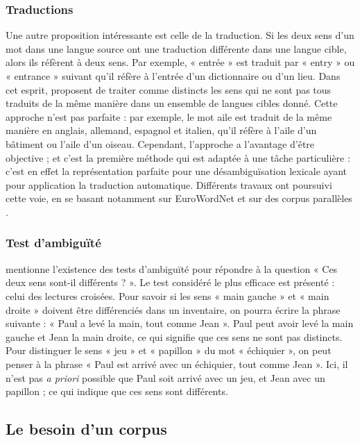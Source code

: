 \subsubsection{Traductions}

Une autre proposition intéressante est celle de la traduction. Si les deux sens d'un mot dans une langue source ont une traduction différente dans une langue cible, alors ils réfèrent à deux sens. Par exemple, « entrée » est traduit par « entry » ou « entrance » suivant qu'il réfère à l'entrée d'un dictionnaire ou d'un lieu. Dans cet esprit, \cite{resnik1997perspective} proposent de traiter comme distincts les sens qui ne sont pas tous traduits de la même manière dans un ensemble de langues cibles donné. Cette approche n'est pas parfaite : par exemple, le mot aile est traduit de la même manière en anglais, allemand, espagnol et italien, qu'il réfère à l'aile d'un bâtiment ou l'aile d'un oiseau. Cependant, l'approche a l'avantage d'être objective ; et c'est la première méthode qui est adaptée à une tâche particulière : c'est en effet la représentation parfaite pour une désambiguïsation lexicale ayant pour application la traduction automatique. Différents travaux ont poursuivi cette voie, en se basant notamment sur EuroWordNet \citep{tufis2006from} et sur des corpus parallèles \citep{chan2007nus,zhong2009word,plas2011automatic}.

\subsubsection{Test d'ambiguïté}

\cite{kilgarriff1997don} mentionne l'existence des tests d'ambiguïté pour répondre à la question « Ces deux sens sont-il différents ? ». Le test considéré le plus efficace est présenté : celui des lectures croisées. Pour savoir si les sens « main gauche » et « main droite » doivent être différenciés dans un inventaire, on pourra écrire la phrase suivante : « Paul a levé la main, tout comme Jean ». Paul peut avoir levé la main gauche et Jean la main droite, ce qui signifie que ces sens ne sont pas distincts. Pour distinguer le sens « jeu » et « papillon » du mot « échiquier », on peut penser à la phrase « Paul est arrivé avec un échiquier, tout comme Jean ». Ici, il n'est pas \textit{a priori} possible que Paul soit arrivé avec un jeu, et Jean avec un papillon ; ce qui indique que ces sens sont différents.

\subsection{Le besoin d'un corpus}
\label{besoincorpus}

